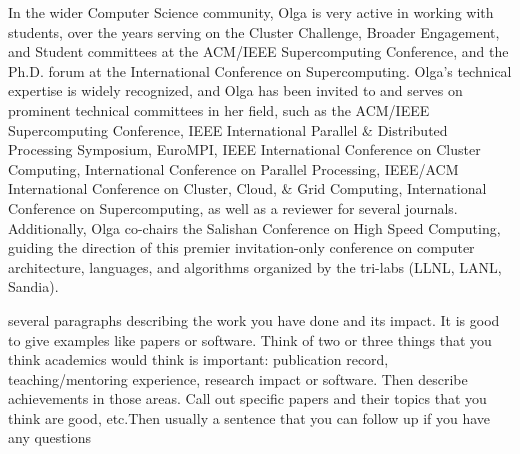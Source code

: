 \documentclass[11pt]{article}
\begin{document}
In the wider Computer Science community, Olga is very active in working with students,
over the years serving on the Cluster Challenge, Broader Engagement, and Student committees at
the ACM/IEEE Supercomputing Conference,
and the Ph.D. forum at the International Conference on Supercomputing.
%
Olga's technical expertise is widely recognized, and Olga has been invited to and serves on
prominent technical committees in her field, such as
the ACM/IEEE Supercomputing Conference,
IEEE International Parallel \& Distributed Processing Symposium,
EuroMPI, IEEE International Conference on Cluster Computing,
International Conference on Parallel Processing,
IEEE/ACM International Conference on Cluster, Cloud, \& Grid Computing,
International Conference on Supercomputing,
as well as a reviewer for several journals.
%
Additionally, Olga co-chairs the
Salishan Conference on High Speed Computing,
guiding the direction of this premier invitation-only conference
on computer architecture, languages, and algorithms organized by the tri-labs (LLNL, LANL, Sandia).








several paragraphs describing the work you have done and its impact. It is good to give examples like papers or software. Think of two or three things that you think academics would think is important: publication record, teaching/mentoring experience, research impact or software. Then describe achievements in those areas. Call out specific papers and their topics that you think are good, etc.Then usually a sentence that you can follow up if you have any questions
\end{document}
